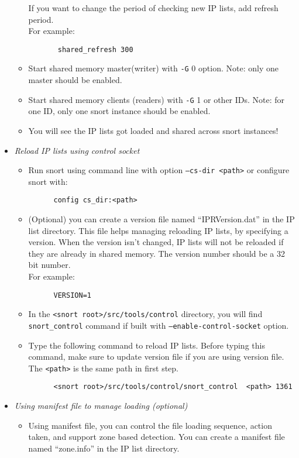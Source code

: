 \documentclass[english]{report}
\begin{document}
\begin{itemize}
\begin{itemize}
      If you want to change the period of checking new IP lists, add refresh period.\\
      For example:

      \begin{verbatim}
       shared_refresh 300
      \end{verbatim}

   \item Start shared memory master(writer) with \texttt{-G} 0 option. Note: only one master
      should be enabled.
   \item Start shared memory clients (readers) with \texttt{-G}  1 or other IDs. Note: for 
      one ID, only one snort instance should be enabled.
   \item You will see the IP lists got loaded and shared across snort instances! 
\end{itemize}

 \item[]\textit{Reload IP lists using control socket}
\begin{itemize}
  \item Run snort using command line with option \texttt{--cs-dir <path>}
      or configure snort with:
     \begin{verbatim} 
      config cs_dir:<path>
     \end{verbatim}
  \item (Optional) you can create a version file named ``IPRVersion.dat'' in the IP list
      directory. This file helps managing reloading IP lists, by specifying a version. 
      When the version isn't changed, IP lists will not be reloaded if they are 
      already in shared memory. The version number should be a 32 bit number.\\
      For example:
     \begin{verbatim}
      VERSION=1
     \end{verbatim}
  \item  In the \texttt{<snort root>/src/tools/control} directory, you will find \texttt{snort\_control} command if 
      built with  \texttt{--enable-control-socket} option. 
  \item  Type the following command to reload IP lists. Before typing this command,
      make sure to update version file if you are using version file.
      The \texttt{<path>} is the same path in first step.\\
     \begin{verbatim}
      <snort root>/src/tools/control/snort_control  <path> 1361
     \end{verbatim}
\end{itemize}
 \item[]\textit{Using manifest file to manage loading (optional)}
\begin{itemize}
 \item[]  Using manifest file, you can control the file loading sequence, action taken,
   and support zone based detection. You can create a manifest file named ``zone.info''
   in the IP list directory.\\
    

\end{itemize}
\end{itemize}
\end{document}
